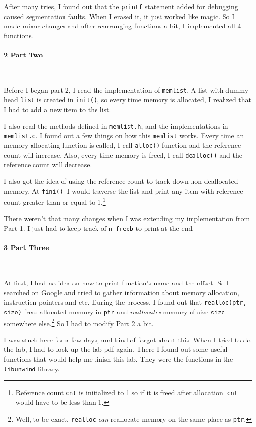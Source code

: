 \documentclass[12pt]{report}
\begin{document}
After many tries, I found out that the \texttt{printf} statement added for debugging caused segmentation faults. When I erased it, it just worked like magic. So I made minor changes and after rearranging functions a bit, I implemented all 4 functions.

\paragraph*{\large 2 Part Two}~

Before I began part 2, I read the implementation of \texttt{memlist}. A list with dummy head \texttt{list} is created in \texttt{init()}, so every time memory is allocated, I realized that I had to add a new item to the list. 

I also read the methods defined in \texttt{memlist.h}, and the implementations in \texttt{memlist.c}. I found out a few things on how this \texttt{memlist} works. Every time an memory allocating function is called, I call \texttt{alloc()} function and the reference count will increase. Also, every time memory is freed, I call \texttt{dealloc()} and the reference count will decrease.

I also got the idea of using the reference count to track down non-deallocated memory. At \texttt{fini()}, I would traverse the list and print any item with reference count greater than or equal to 1.\footnote{Reference count \texttt{cnt} is initialized to 1 so if it is freed after allocation, \texttt{cnt} would have to be less than 1.}

There weren't that many changes when I was extending my implementation from Part 1. I just had to keep track of \texttt{n\_freeb} to print at the end.


\paragraph*{\large 3 Part Three}~

At first, I had no idea on how to print function's name and the offset. So I searched on Google and tried to gather information about memory allocation, instruction pointers and etc. During the process, I found out that \texttt{realloc(ptr, size)} frees allocated memory in \texttt{ptr} and \textit{reallocates} memory of size \texttt{size} somewhere else.\footnote{Well, to be exact, \texttt{realloc} \textit{can} reallocate memory on the same place as \texttt{ptr}.} So I had to modify Part 2 a bit.

I was stuck here for a few days, and kind of forgot about this. When I tried to do the lab, I had to look up the lab pdf again. There I found out some useful functions that would help me finish this lab. They were the functions in the \texttt{libunwind} library.
\end{document}

